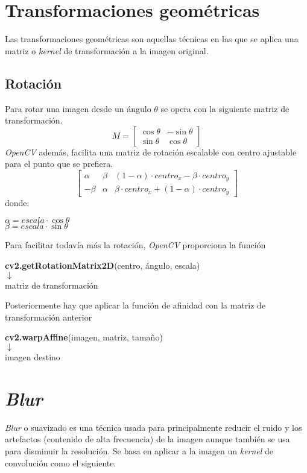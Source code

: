 \section{Transformaciones geométricas}
Las transformaciones geométricas son aquellas técnicas en las que se
aplica una matriz o \emph{kernel} de transformación a la imagen original.
\subsection{Rotación}
Para rotar una imagen desde un ángulo $\theta$ se opera con la
siguiente matriz de transformación.
\begin{equation*}
  M =
  \begin{bmatrix}
    \cos \theta & -\sin \theta \\ \sin \theta & \cos \theta
  \end{bmatrix}
\end{equation*}
\emph{OpenCV} además, facilita una matriz de rotación escalable con
centro ajustable para el punto que se prefiera.
\begin{equation*}
  \begin{bmatrix}
    \alpha & \beta & (1 - \alpha) \cdot centro_x - \beta \cdot centro_y \\
    - \beta & \alpha & \beta \cdot centro_x + (1 - \alpha) \cdot centro_y
  \end{bmatrix}
\end{equation*}
donde:
\begin{center}
$
\alpha = escala \cdot \cos \theta
$
\\
$
\beta = escala \cdot \sin \theta
$
\end{center}
Para facilitar todavía más la rotación, \emph{OpenCV} proporciona la función
\begin{center}
\textbf{cv2.getRotationMatrix2D}(centro, ángulo, escala) \\
$\downarrow$ \\
matriz de transformación
\end{center}
Posteriormente hay que aplicar la función de afinidad con la matriz de transformación anterior \\
\begin{center}
\textbf{cv2.warpAffine}(imagen, matriz, tamaño)\\
$\downarrow$ \\
imagen destino
\end{center}

\section{\emph{Blur}}
\emph{Blur} o suavizado es una técnica usada para principalmente
reducir el ruido y los artefactos (contenido de alta frecuencia) de la
imagen aunque también se usa para disminuir la resolución. Se basa en
aplicar a la imagen un \emph{kernel} de convolución como el siguiente.
